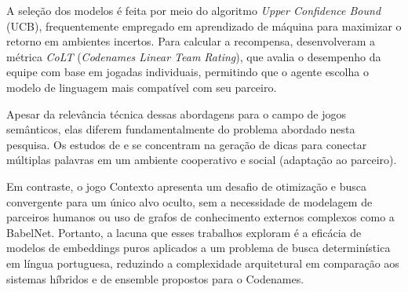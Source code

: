A seleção dos modelos é feita por meio do algoritmo \textit{Upper Confidence Bound} (UCB), frequentemente empregado em aprendizado de máquina para maximizar o retorno em ambientes incertos. Para calcular a recompensa,  desenvolveram a métrica \textit{CoLT} (\textit{Codenames Linear Team Rating}), que avalia o desempenho da equipe com base em jogadas individuais, permitindo que o agente escolha o modelo de linguagem mais compatível com seu parceiro.

Apesar da relevância técnica dessas abordagens para o campo de jogos semânticos, elas diferem fundamentalmente do problema abordado nesta pesquisa. Os estudos de  e  se concentram na geração de dicas para conectar múltiplas palavras em um ambiente cooperativo e social (adaptação ao parceiro). 

Em contraste, o jogo Contexto apresenta um desafio de otimização e busca convergente para um único alvo oculto, sem a necessidade de modelagem de parceiros humanos ou uso de grafos de conhecimento externos complexos como a BabelNet. Portanto, a lacuna que esses trabalhos exploram é a eficácia de modelos de embeddings puros aplicados a um problema de busca determinística em língua portuguesa, reduzindo a complexidade arquitetural em comparação aos sistemas híbridos e de ensemble propostos para o Codenames.